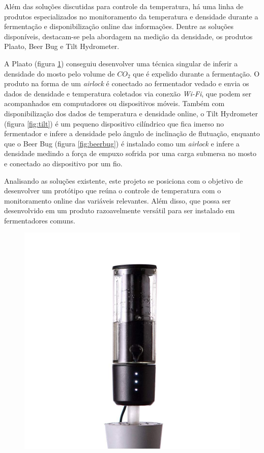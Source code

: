 Além das soluções discutidas para controle da temperatura, há uma linha de produtos especializados no monitoramento da temperatura e densidade durante a fermentação e disponibilização online das informações. Dentre as soluções disponíveis, destacam-se pela abordagem na medição da densidade, os produtos Plaato, Beer Bug e Tilt Hydrometer.

A Plaato (figura \ref{fig:plaato}) conseguiu desenvolver uma técnica singular de inferir a densidade do mosto pelo volume de \(CO_2\) que é expelido durante a fermentação. O produto na forma de um \textit{airlock} é conectado ao fermentador vedado e envia os dados de densidade e temperatura coletados via conexão \textit{Wi-Fi}, que podem ser acompanhados em computadores ou dispositivos móveis. Também com disponibilização dos dados de temperatura e densidade online, o Tilt Hydrometer (figura \ref{fig:tilt}) é um pequeno dispositivo cilíndrico que fica imerso no fermentador e infere a densidade pelo ângulo de inclinação de flutuação, enquanto que o Beer Bug (figura \ref{fig:beerbug}) é instalado como um \textit{airlock} e infere a densidade medindo a força de empuxo sofrida por uma carga submersa no mosto e conectado ao dispositivo por um fio.

Analisando as soluções existente, este projeto se posiciona com o objetivo de desenvolver um protótipo que reúna o controle de temperatura com o monitoramento online das variáveis relevantes. Além disso, que possa ser desenvolvido em um produto razoavelmente versátil para ser instalado em fermentadores comuns.

\begin{figure}[h]
    \centering
    \includegraphics[scale=0.25]{figuras/contexto/plaato.jpg}
    \label{fig:plaato}
\end{figure}


